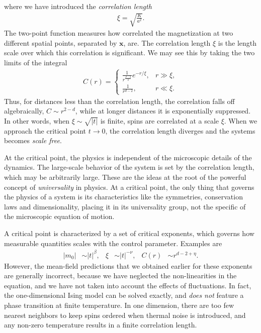 %
where we have introduced the \emph{correlation length}
%
\begin{align}
    \xi = \sqrt{ \frac{ K }{ a^2 } }.
\end{align}
%
The two-point function measures how correlated the magnetization at two different spatial points, separated by $\bm x$, are.
The correlation length $\xi$ is the length scale over which this correlation is significant.
We may see this by taking the two limits of the integral
%
\begin{align}
    C(r) = 
    \begin{cases}
        \frac{1}{r^{\frac{d - 2}{2}}} e^{- r / \xi}, & r \gg \xi, \\
        \frac{1}{r^{d - 2}}, & r \ll \xi.
    \end{cases}
\end{align}
%
Thus, for distances less than the correlation length, the correlation falls off algebraically, $C \sim r^{2 - d}$, while at longer distances it is exponentially suppressed.
In other words, when $\xi \sim \sqrt{ |t| }$ is finite, spins are correlated at a scale $\xi$.
When we approach the critical point $t \rightarrow 0$, the correlation length diverges and the systems becomes \emph{scale free}.

At the critical point, the physics is independent of the microscopic details of the dynamics.
The large-scale behavior of the system is set by the correlation length, which may be arbitrarily large.
These are the ideas at the root of the powerful concept of \emph{universality} in physics.
At a critical point, the only thing that governs the physics of a system is its characteristics like the symmetries, conservation laws and dimensionality, placing it in its universality group, not the specific of the microscopic equation of motion.

A critical point is characterized by a set of critical exponents, which governs how measurable quantities scales with the control parameter.
Examples are
%
\begin{align}
    |m_0| &\sim |t|^\beta, &
    \xi & \sim |t|^{-\nu}, &
    C(r) & \sim r^{d - 2 + \eta}.
\end{align}
%
However, the mean-field predictions that we obtained earlier for these exponents are generally incorrect, because we have neglected the non-linearities in the equation, and we have not taken into account the effects of fluctuations.
In fact, the one-dimensional Ising model can be solved exactly, and \emph{does not} feature a phase transition at finite temperature.
In one dimension, there are too few nearest neighbors to keep spins ordered when thermal noise is introduced, and any non-zero temperature results in a finite correlation length.

